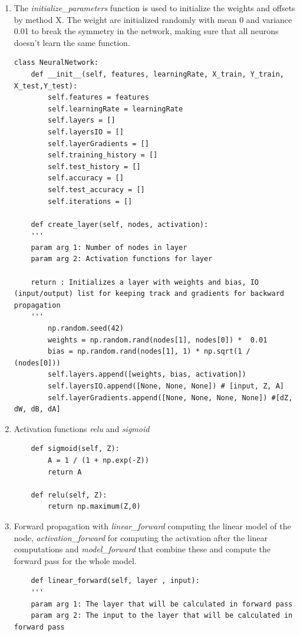\documentclass[a4paper,10pt]{article}
\begin{document}
\begin{enumerate}
    \item The \emph{initialize\_parameters} function is used to initialize the weights and offsets by method X. The weight are initialized randomly with mean 0 and variance 0.01 to break the symmetry in the network, making sure that all neurons doesn't learn the same function. 

\begin{lstlisting}
class NeuralNetwork:
    def __init__(self, features, learningRate, X_train, Y_train, X_test,Y_test):
        self.features = features
        self.learningRate = learningRate
        self.layers = []
        self.layersIO = []
        self.layerGradients = []
        self.training_history = []
        self.test_history = []
        self.accuracy = []
        self.test_accuracy = []
        self.iterations = []

    def create_layer(self, nodes, activation):
    ''' 
    param arg 1: Number of nodes in layer
    param arg 2: Activation functions for layer

    return : Initializes a layer with weights and bias, IO (input/output) list for keeping track and gradients for backward propagation
    '''
        np.random.seed(42)
        weights = np.random.rand(nodes[1], nodes[0]) *  0.01 
        bias = np.random.rand(nodes[1], 1) * np.sqrt(1 / (nodes[0]))
        self.layers.append([weights, bias, activation]) 
        self.layersIO.append([None, None, None]) # [input, Z, A]
        self.layerGradients.append([None, None, None, None]) #[dZ, dW, dB, dA]
\end{lstlisting}

    \item Activation functions \emph{relu} and \emph{sigmoid}

\begin{lstlisting}
    def sigmoid(self, Z):
        A = 1 / (1 + np.exp(-Z))
        return A

    def relu(self, Z):
        return np.maximum(Z,0)
\end{lstlisting}
    
    \item Forward propagation with \emph{linear\_forward} computing the linear model of the node, \emph{activation\_forward} for computing the activation after the linear computations and \emph{model\_forward} that combine these and compute the forward pass for the whole model. 

\begin{lstlisting}
    def linear_forward(self, layer , input):
    '''
    param arg 1: The layer that will be calculated in forward pass
    param arg 2: The input to the layer that will be calculated in forward pass


\end{lstlisting}
\end{enumerate}
\end{document}
